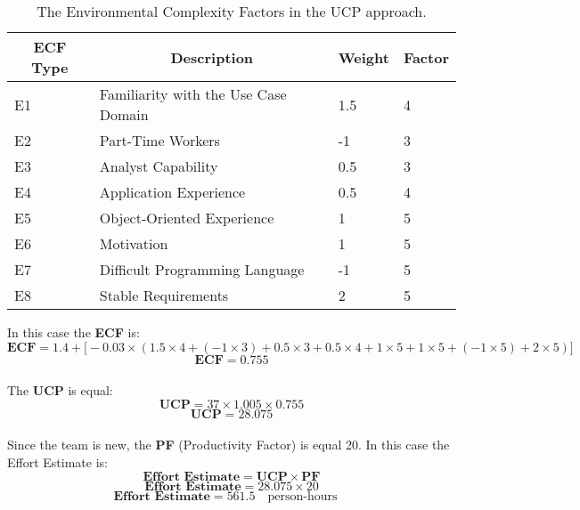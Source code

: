 \documentclass[12pt]{article}
\begin{document}
\begin{table}[h]
\centering
\caption{The Environmental Complexity Factors in the UCP approach.}
\begin{tabular}{|l|l|l|l|}
\hline
\multicolumn{1}{|c|}{\textbf{ECF Type}} & \multicolumn{1}{c|}{\textbf{Description}} & \multicolumn{1}{c|}{\textbf{Weight}} & \multicolumn{1}{c|}{\textbf{Factor}} \\ \hline
E1 & Familiarity with the Use Case Domain & 1.5 & 4 \\ \hline
E2 & Part-Time Workers & -1 & 3 \\ \hline
E3 & Analyst Capability & 0.5 & 3 \\ \hline
E4 & Application Experience & 0.5 & 4 \\ \hline
E5 & Object-Oriented Experience & 1 & 5 \\ \hline
E6 & Motivation & 1 & 5 \\ \hline
E7 & Difficult Programming Language & -1 & 5 \\ \hline
E8 & Stable Requirements & 2 & 5 \\ \hline
\end{tabular}
\end{table}

In this case the \textbf{ECF} is:
\begin{equation}
    \textbf{ECF} =  1.4 + \Big[-0.03 \times(1.5\times4+(-1\times3)+0.5\times3+0.5\times4+1\times5+1\times5+(-1\times5)+2\times5)\Big]
\end{equation}
\begin{equation}
    \textbf{ECF} =  0.755
\end{equation}\\

The \textbf{UCP} is equal:
\begin{equation}
    \textbf{UCP} = 37 \times 1.005 \times 0.755
\end{equation}
\begin{equation}
    \textbf{UCP} = 28.075
\end{equation}\\

Since the team is new, the \textbf{PF} (Productivity Factor) is equal 20.
In this case the Effort Estimate is:
\begin{equation}
    \textbf{Effort Estimate} = \textbf{UCP} \times \textbf{PF}
\end{equation}
\begin{equation}
    \textbf{Effort Estimate} = 28.075 \times 20
\end{equation}
\begin{equation}
    \textbf{Effort Estimate} = 561.5 \quad \textrm{person-hours} \quad
\end{equation}\\
\end{document}
